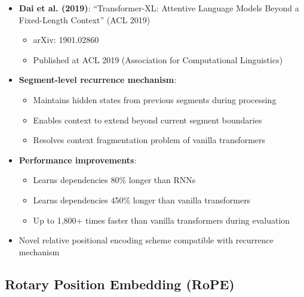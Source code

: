 \documentclass[11pt,letterpaper]{article}
\begin{document}
\begin{itemize}[leftmargin=*]
    \item \textbf{Dai et al. (2019)}: ``Transformer-XL: Attentive Language Models Beyond a Fixed-Length Context'' (ACL 2019)
    \begin{itemize}
        \item arXiv: 1901.02860
        \item Published at ACL 2019 (Association for Computational Linguistics)
    \end{itemize}

    \item \textbf{Segment-level recurrence mechanism}:
    \begin{itemize}
        \item Maintains hidden states from previous segments during processing
        \item Enables context to extend beyond current segment boundaries
        \item Resolves context fragmentation problem of vanilla transformers
    \end{itemize}

    \item \textbf{Performance improvements}:
    \begin{itemize}
        \item Learns dependencies 80\% longer than RNNs
        \item Learns dependencies 450\% longer than vanilla transformers
        \item Up to 1,800+ times faster than vanilla transformers during evaluation
    \end{itemize}

    \item Novel relative positional encoding scheme compatible with recurrence mechanism
\end{itemize}

\subsection{Rotary Position Embedding (RoPE)}
\end{document}
